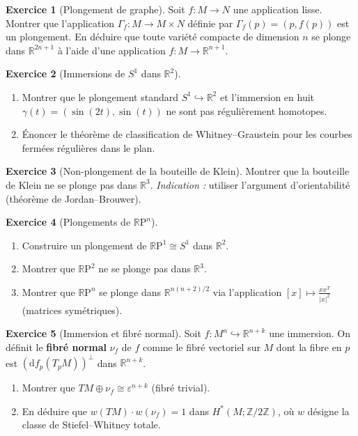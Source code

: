 \documentclass[12pt,a4paper,openany]{book}
\theoremstyle{definition}
\newtheorem{exercice}{Exercice}[chapter]
\theoremstyle{plain}
\theoremstyle{remark}
\newcommand{\Z}{\mathbb{Z}}
\newcommand{\R}{\mathbb{R}}
\newcommand{\RP}{\mathbb{R}\mathrm{P}}
\newcommand{\dd}{\mathrm{d}}
\newcommand{\abs}[1]{\left|#1\right|}
\begin{document}
\begin{exercice}[Plongement de graphe]\label{exo:whitney-1}
Soit $f : M \to N$ une application lisse. Montrer que l'application
$\Gamma_f : M \to M \times N$ définie par $\Gamma_f(p) = (p, f(p))$ est un
plongement. En déduire que toute variété compacte de dimension $n$ se plonge
dans $\R^{2n+1}$ à l'aide d'une application $f : M \to \R^{n+1}$.
\end{exercice}

\begin{exercice}[Immersions de $S^1$ dans $\R^2$]\label{exo:whitney-2}
\begin{enumerate}[label=(\alph*)]
  \item Montrer que le plongement standard $S^1 \hookrightarrow \R^2$ et
    l'immersion en huit $\gamma(t) = (\sin(2t), \sin(t))$ ne sont pas
    régulièrement homotopes.
  \item Énoncer le théorème de classification de Whitney--Graustein pour les
    courbes fermées régulières dans le plan.
\end{enumerate}
\end{exercice}

\begin{exercice}[Non-plongement de la bouteille de Klein]\label{exo:whitney-3}
Montrer que la bouteille de Klein ne se plonge pas dans $\R^3$.
\emph{Indication :} utiliser l'argument d'orientabilité (théorème de
Jordan--Brouwer).
\end{exercice}

\begin{exercice}[Plongements de $\RP^n$]\label{exo:whitney-4}
\begin{enumerate}[label=(\alph*)]
  \item Construire un plongement de $\RP^1 \cong S^1$ dans $\R^2$.
  \item Montrer que $\RP^2$ ne se plonge pas dans $\R^3$.
  \item Montrer que $\RP^n$ se plonge dans $\R^{n(n+2)/2}$ via l'application
    $[x] \mapsto \frac{x x^T}{\abs{x}^2}$ (matrices symétriques).
\end{enumerate}
\end{exercice}

\begin{exercice}[Immersion et fibré normal]\label{exo:whitney-5}
Soit $f : M^n \hookrightarrow \R^{n+k}$ une immersion. On définit le
\textbf{fibré normal} $\nu_f$ de $f$ comme le fibré
vectoriel sur $M$ dont la fibre en $p$ est $(\dd f_p(T_pM))^\perp$ dans
$\R^{n+k}$.
\begin{enumerate}[label=(\alph*)]
  \item Montrer que $TM \oplus \nu_f \cong \varepsilon^{n+k}$ (fibré trivial).
  \item En déduire que $w(TM) \cdot w(\nu_f) = 1$ dans
    $H^*(M; \Z/2\Z)$, où $w$ désigne la classe de Stiefel--Whitney totale.
\end{enumerate}
\end{exercice}
\end{document}
